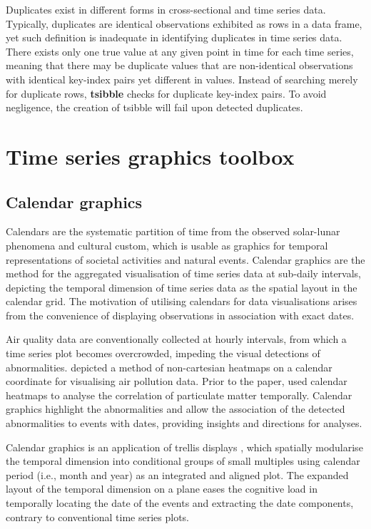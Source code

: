 \documentclass{aucklandthesis}
\begin{document}
Duplicates exist in different forms in cross-sectional and time series data. Typically, duplicates are identical observations exhibited as rows in a data frame, yet such definition is inadequate in identifying duplicates in time series data. There exists only one true value at any given point in time for each time series, meaning that there may be duplicate values that are non-identical observations with identical key-index pairs yet different in values. Instead of searching merely for duplicate rows, \textbf{tsibble} checks for duplicate key-index pairs. To avoid negligence, the creation of tsibble will fail upon detected duplicates.

\hypertarget{time-series-graphics-toolbox}{%
\section{Time series graphics toolbox}\label{time-series-graphics-toolbox}}

\hypertarget{calendar-graphics}{%
\subsection{Calendar graphics}\label{calendar-graphics}}

Calendars are the systematic partition of time from the observed solar-lunar phenomena and cultural custom, which is usable as graphics for temporal representations of societal activities and natural events. Calendar graphics are the method for the aggregated visualisation of time series data at sub-daily intervals, depicting the temporal dimension of time series data as the spatial layout in the calendar grid. The motivation of utilising calendars for data visualisations arises from the convenience of displaying observations in association with exact dates.

Air quality data are conventionally collected at hourly intervals, from which a time series plot becomes overcrowded, impeding the visual detections of abnormalities. \textcite{calmap} depicted a method of non-cartesian heatmaps on a calendar coordinate for visualising air pollution data. Prior to the paper, \textcite{calmapi} used calendar heatmaps to analyse the correlation of particulate matter temporally. Calendar graphics highlight the abnormalities and allow the association of the detected abnormalities to events with dates, providing insights and directions for analyses.

Calendar graphics is an application of trellis displays \autocite{trellis}, which spatially modularise the temporal dimension into conditional groups of small multiples \autocite{tufte} using calendar period (i.e., month and year) as an integrated and aligned plot. The expanded layout of the temporal dimension on a plane eases the cognitive load \autocite{tufte} in temporally locating the date of the events and extracting the date components, contrary to conventional time series plots.
\end{document}
